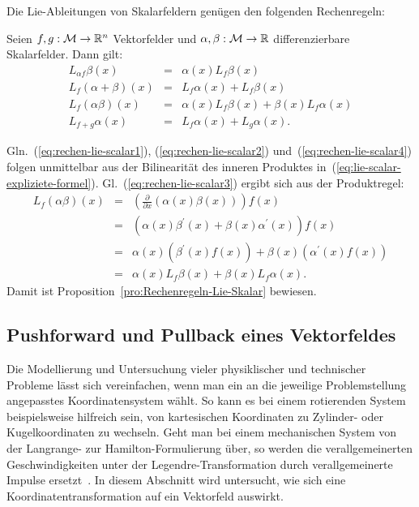 Die Lie-Ableitungen von Skalarfeldern genügen den folgenden Rechen\-regeln:
\begin{proposition}
\label{pro:Rechenregeln-Lie-Skalar}Seien $f,g:\mathcal{M}\to{\mathbb{R}}^{n}$
Vektorfelder und $\alpha,\beta:\mathcal{M}\to{\mathbb{R}}$ differenzierbare
Skalarfelder. Dann gilt: \begin{subequations}
\begin{eqnarray}
L_{\alpha f}\beta(x) & = & \alpha(x)L_{f}\beta(x)\label{eq:rechen-lie-scalar1}\\
L_{f}(\alpha+\beta)(x) & = & L_{f}\alpha(x)+L_{f}\beta(x)\label{eq:rechen-lie-scalar2}\\
L_{f}(\alpha\beta)(x) & = & \alpha(x)L_{f}\beta(x)+\beta(x)L_{f}\alpha(x)\label{eq:rechen-lie-scalar3}\\
L_{f+g}\alpha(x) & = & L_{f}\alpha(x)+L_{g}\alpha(x).\label{eq:rechen-lie-scalar4}
\end{eqnarray}
\end{subequations}
\end{proposition}
\begin{svmultproof2}
Gln.~(\ref{eq:rechen-lie-scalar1}), (\ref{eq:rechen-lie-scalar2})
und~(\ref{eq:rechen-lie-scalar4}) folgen unmittelbar aus der Bilinearität
des inneren Produktes in~(\ref{eq:lie-scalar-expliziete-formel}).
Gl.~(\ref{eq:rechen-lie-scalar3}) ergibt sich aus der Produktregel:
\begin{eqnarray*}
L_{f}(\alpha\beta)(x) & = & \left(\frac{\partial}{\partial x}\left(\alpha(x)\beta(x)\right)\right)f(x)\\
 & = & \left(\alpha(x)\beta^{\prime}(x)+\beta(x)\alpha^{\prime}(x)\right)f(x)\\
 & = & \alpha(x)\left(\beta^{\prime}(x)f(x)\right)+\beta(x)\left(\alpha^{\prime}(x)f(x)\right)\\
 & = & \alpha(x)L_{f}\beta(x)+\beta(x)L_{f}\alpha(x).
\end{eqnarray*}
Damit ist Proposition~\ref{pro:Rechenregeln-Lie-Skalar} bewiesen.
\end{svmultproof2}


\subsection{Pushforward und Pullback eines Vektorfeldes}

Die Modellierung und Untersuchung vieler physiklischer und technischer
Probleme lässt sich vereinfachen, wenn man ein an die jeweilige Problemstellung
angepasstes Koordinatensystem wählt. So kann es bei einem rotierenden
System beispielsweise hilfreich sein, von kartesischen Koordinaten
zu Zylinder- oder Kugelkoordinaten zu wechseln. Geht man bei einem
mechanischen System von der Langrange- zur Hamilton-Formulierung über,
so werden die verallgemeinerten Geschwindigkeiten unter der Legendre-Transformation
durch verallgemeinerte Impulse ersetzt~\cite{nolting2}. In diesem
Abschnitt wird untersucht, wie sich eine Koordinatentransformation
auf ein Vektorfeld auswirkt. 

